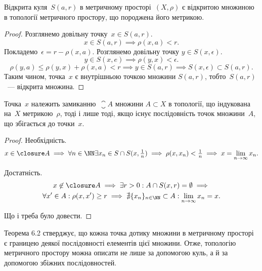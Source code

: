 \begin{theorem}
Відкрита куля~$S(a, r)$ в метричному
просторі~$(X, \rho)$ є відкритою множиною в топології
метричного простору, що породжена його метрикою.
\end{theorem}

\begin{proof}
Розглянемо довільну точку~$x \in S(a, r)$.
\begin{equation*}
    x \in S(a, r) \implies
    \rho(x, a) < r.
\end{equation*}
Покладемо~$\epsilon = r - \rho(x, a)$. Розглянемо довільну точку
$y \in S(x, \epsilon)$.
\begin{equation*}
    y \in S(x, e) \implies
    \rho(y, x) < \epsilon.
\end{equation*}
\begin{equation*}
    \rho(y, a) \le
    \rho(y, x) + \rho(x, a) < r \implies
    y \in S(a, r) \implies S(x, \epsilon) \subset S(a, r).
\end{equation*}
Таким чином, точка~$x$ є внутрішньою точкою множини
$S(a, r)$, тобто~$S(a, r)$~--- відкрита множина. 
\end{proof}

\begin{theorem}
Точка~$x$ належить замиканню~$\closure A$ множини
$A \subset X$ в топології, що індукована на~$X$ метрикою~$\rho$, тоді і
лише тоді, якщо існує послідовність точок множини~$A$, що
збігається до точки~$x$.
\end{theorem}

\begin{proof}
Необхідність.
\begin{equation*}
    x \in \closure A \implies
    \forall n \in \NN \exists x_n \in S \cap S(x, \tfrac{1}{n}) \implies
    \rho(x, x_n) < \tfrac{1}{n} \implies
    x = \lim_{n \to \infty} x_n.
\end{equation*}

Достатність.
\begin{multline*}
    x \not\in \closure A \implies
    \exists r > 0: A \cap S(x, r) = \emptyset \implies \\
    \forall x' \in A: \rho(x, x') \ge r \implies
    \nexists \{x_n\}_{n \in \NN} \subset A: \lim_{n \to \infty} x_n = x.
\end{multline*}

Що і треба було довести.
\end{proof}

\begin{corollary}
Теорема 6.2 стверджує, що кожна точка
дотику множини в метричному просторі є границею деякої
послідовності елементів цієї множини. Отже, топологію
метричного простору можна описати не лише за
допомогою куль, а й за допомогою збіжних послідовностей.
\end{corollary}

